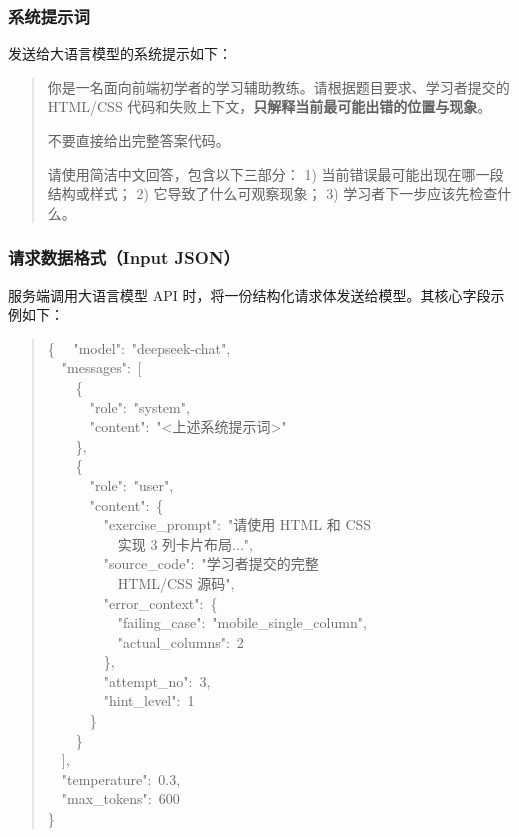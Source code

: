\begin{appendices}
\subsubsection*{系统提示词}

发送给大语言模型的系统提示如下：

\begin{quote}
你是一名面向前端初学者的学习辅助教练。请根据题目要求、学习者提交的 HTML/CSS 代码和失败上下文，\textbf{只解释当前最可能出错的位置与现象}。

不要直接给出完整答案代码。

请使用简洁中文回答，包含以下三部分：
1) 当前错误最可能出现在哪一段结构或样式；
2) 它导致了什么可观察现象；
3) 学习者下一步应该先检查什么。
\end{quote}

\subsubsection*{请求数据格式（Input JSON）}

服务端调用大语言模型 API 时，将一份结构化请求体发送给模型。其核心字段示例如下：

\begin{quote}\small\ttfamily
\{
\ \ "model":\ "deepseek-chat",\\
\ \ "messages":\ [\\
\ \ \ \ \{\\
\ \ \ \ \ \ "role":\ "system",\\
\ \ \ \ \ \ "content":\ "<上述系统提示词>"\\
\ \ \ \ \},\\
\ \ \ \ \{\\
\ \ \ \ \ \ "role":\ "user",\\
\ \ \ \ \ \ "content":\ \{\\
\ \ \ \ \ \ \ \ "exercise\_prompt":\ "请使用 HTML 和 CSS\\
\ \ \ \ \ \ \ \ \ \ 实现 3 列卡片布局...",\\
\ \ \ \ \ \ \ \ "source\_code":\ "学习者提交的完整\\
\ \ \ \ \ \ \ \ \ \ HTML/CSS 源码",\\
\ \ \ \ \ \ \ \ "error\_context":\ \{\\
\ \ \ \ \ \ \ \ \ \ "failing\_case":\ "mobile\_single\_column",\\
\ \ \ \ \ \ \ \ \ \ "actual\_columns":\ 2\\
\ \ \ \ \ \ \ \ \},\\
\ \ \ \ \ \ \ \ "attempt\_no":\ 3,\\
\ \ \ \ \ \ \ \ "hint\_level":\ 1\\
\ \ \ \ \ \ \}\\
\ \ \ \ \}\\
\ \ ],\\
\ \ "temperature":\ 0.3,\\
\ \ "max\_tokens":\ 600\\
\}
\end{quote}


\end{appendices}
